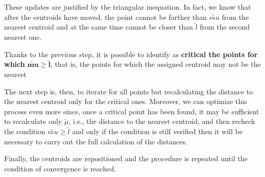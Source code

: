 \documentclass{report}
\begin{document}
\begin{minipage}[b]{0.48\textwidth}
  These updates are justified by the triangular inequation. In fact, we know that after the centroids have moved, the point cannot be farther than $\tilde{mu}$ from the nearest centroid and at the same time cannot be closer than $\tilde{l}$ from the second nearest one.

  Thanks to the previous step, it is possible to identify as \textbf{critical the points for which } $\mathbf{\tilde{mu} \geq \tilde{l}}$, that is, the points for which the assigned centroid may not be the nearest
  
  The next step is, then, to iterate for all points but recalculating the distance to the nearest centroid only for the critical ones. Moreover, we can optimize this process even more since, once a critical point has been found, it may be sufficient to recalculate only $\tilde{\mu}$, i.e., the distance to the nearest centroid, and then recheck the condition $\tilde{mu} \geq \tilde{l}$ and only if the condition is still verified then it will be necessary to carry out the full calculation of the distances.
  
  Finally, the centroids are repositioned and the procedure is repeated until the condition of convergence is reached.
\end{minipage}

\newpage
\end{document}
